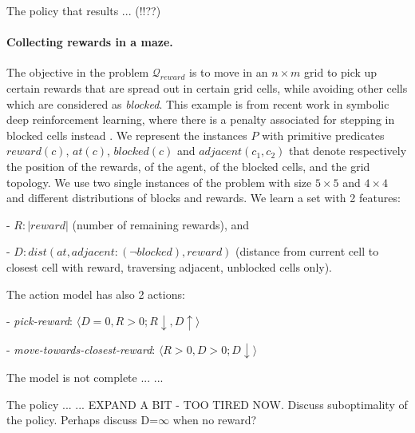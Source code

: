 \documentclass[letterpaper]{article} %
\newcommand{\tuple}[1]{\ensuremath{\langle #1 \rangle}}
\newcommand{\abs}[1]{\ensuremath{\left\vert{#1}\right\vert}}
\newcommand{\Q}{\mathcal{Q}}
\begin{document}
The policy that results ... (!!??)



% 
% 
% 
% 




\paragraph{Collecting rewards in a maze.}
The objective in the problem $\Q_{reward}$ is to move in an $n \times m$ grid to pick up certain
rewards that are spread out in certain grid cells, while avoiding other cells which are considered as \emph{blocked}.
This example is from recent work in symbolic deep
reinforcement learning, where there is a penalty associated for
stepping in blocked cells instead \cite{garnelo2016towards}.
%
We represent the instances $P$ with primitive predicates $reward(c)$, $at(c)$, $blocked(c)$ and $adjacent(c_1, c_2)$ that denote
respectively the position of the rewards, of the agent, of the blocked cells, and the grid topology.
We use two single instances of the problem with size $5 \times 5$ and $4 \times 4$ and different distributions of blocks and rewards.
We learn a set with 2 features:

- $R: \abs{reward}$ (number of remaining rewards), and

- $D: dist(at, adjacent:(\neg blocked), reward)$ (distance from current cell to closest cell with reward, traversing adjacent, unblocked cells only).

\noindent The action model has also 2 actions:

- \emph{pick-reward}: \tuple{D=0, R > 0;  R \downarrow, D \uparrow}

- \emph{move-towards-closest-reward}: \tuple{R>0, D>0; D \downarrow}

The model is not complete ... 
...

The policy ... 
... EXPAND A BIT - TOO TIRED NOW.
Discuss suboptimality of the policy.
Perhaps discuss D=$\infty$ when no reward?
\end{document}
